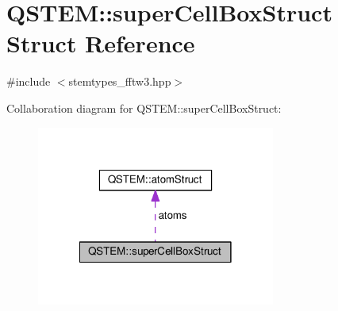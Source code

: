 \hypertarget{struct_q_s_t_e_m_1_1super_cell_box_struct}{\section{Q\-S\-T\-E\-M\-:\-:super\-Cell\-Box\-Struct Struct Reference}
\label{struct_q_s_t_e_m_1_1super_cell_box_struct}
}


{\ttfamily \#include $<$stemtypes\-\_\-fftw3.\-hpp$>$}



Collaboration diagram for Q\-S\-T\-E\-M\-:\-:super\-Cell\-Box\-Struct\-:
\nopagebreak
\begin{figure}[H]
\begin{center}
\leavevmode
\includegraphics[width=222pt]{struct_q_s_t_e_m_1_1super_cell_box_struct__coll__graph}
\end{center}
\end{figure}
